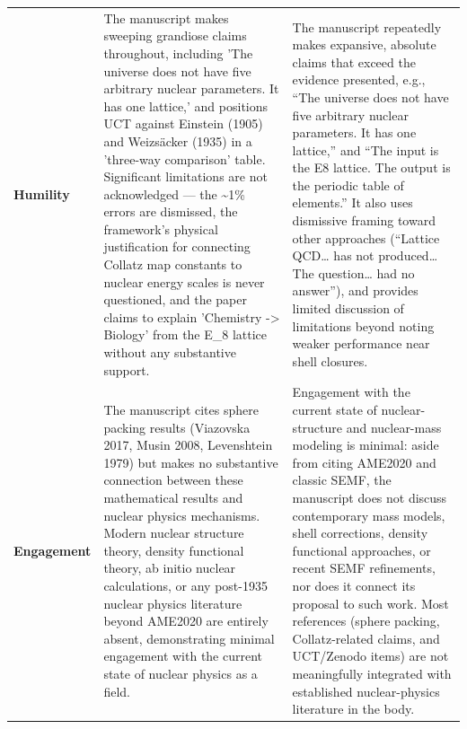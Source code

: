 \documentclass[11pt]{article}
\begin{document}
\begin{longtable}{@{} p{2.2cm} p{6.3cm} p{6.3cm} @{}}
\rowcolor{rowgray}
\textbf{Humility} &
The manuscript makes sweeping grandiose claims throughout, including 'The universe does not have five arbitrary nuclear parameters. It has one lattice,' and positions UCT against Einstein (1905) and Weizsäcker (1935) in a 'three-way comparison' table. Significant limitations are not acknowledged — the \textasciitilde{}1\% errors are dismissed, the framework's physical justification for connecting Collatz map constants to nuclear energy scales is never questioned, and the paper claims to explain 'Chemistry -> Biology' from the E\_8 lattice without any substantive support. &
The manuscript repeatedly makes expansive, absolute claims that exceed the evidence presented, e.g., “The universe does not have five arbitrary nuclear parameters. It has one lattice,” and “The input is the E8 lattice. The output is the periodic table of elements.” It also uses dismissive framing toward other approaches (“Lattice QCD… has not produced… The question… had no answer”), and provides limited discussion of limitations beyond noting weaker performance near shell closures. \\[6pt]

\textbf{Engagement} &
The manuscript cites sphere packing results (Viazovska 2017, Musin 2008, Levenshtein 1979) but makes no substantive connection between these mathematical results and nuclear physics mechanisms. Modern nuclear structure theory, density functional theory, ab initio nuclear calculations, or any post-1935 nuclear physics literature beyond AME2020 are entirely absent, demonstrating minimal engagement with the current state of nuclear physics as a field. &
Engagement with the current state of nuclear-structure and nuclear-mass modeling is minimal: aside from citing AME2020 and classic SEMF, the manuscript does not discuss contemporary mass models, shell corrections, density functional approaches, or recent SEMF refinements, nor does it connect its proposal to such work. Most references (sphere packing, Collatz-related claims, and UCT/Zenodo items) are not meaningfully integrated with established nuclear-physics literature in the body. \\[6pt]


\end{longtable}
\end{document}
